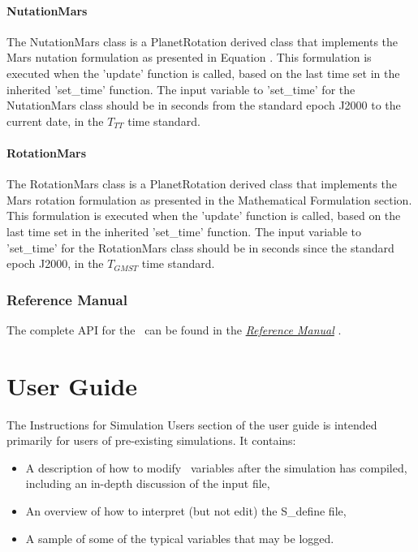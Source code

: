 \subsubsection{NutationMars}

The NutationMars class is a PlanetRotation derived class that implements the
Mars nutation formulation as presented in Equation \cite{Konopliv06}.
This formulation is executed when the 'update' function is called, based
on the last time set in the inherited 'set\_time' function. The input
variable to 'set\_time' for the NutationMars class should be in
seconds from the standard epoch J2000 to the current date, in the
$T_{TT}$ time standard.

\subsubsection{RotationMars}

The RotationMars class is a PlanetRotation derived class that implements the
Mars rotation formulation as presented in the Mathematical Formulation
section. This formulation is executed when the 'update' function is called,
based on the last time set in the inherited 'set\_time' function. The input
variable to 'set\_time' for the RotationMars class should be in seconds
since the standard epoch J2000, in the $T_{GMST}$ time standard.

\subsection{Reference Manual}

The complete API for the \ModelDesc\ can be found
in the  \href{file:refman.pdf} {\em Reference Manual}
\cite{RNPbib:ReferenceManual}.

\clearpage
\boilerplateinventory

\chapter{User Guide}\label{ch:user}
The Instructions for Simulation Users section of the user guide is intended
primarily for users of pre-existing simulations. It contains:
\begin{itemize}
\item A description of how to modify \ModelDesc\ variables after the simulation
has compiled, including an in-depth discussion of the input file,
\item An overview of how to interpret (but not edit) the S\_define file,
\item A sample of some of the typical variables that may be logged.
\end{itemize}

